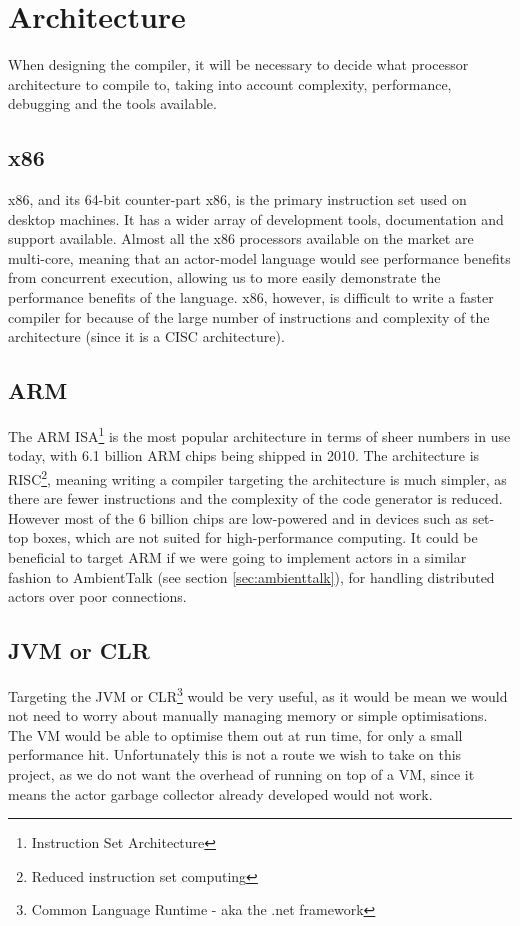 \documentclass[pdftex,11pt,a4paper]{report}
\begin{document}
\newpage
\section{Architecture}

When designing the compiler, it will be necessary to decide what processor architecture to compile to, taking into account complexity, performance, debugging and the tools available.

\subsection{x86}

x86, and its 64-bit counter-part x86, is the primary instruction set used on desktop machines. It has a wider array of development tools, documentation and support available.
Almost all the x86 processors available on the market are multi-core, meaning that an actor-model language would see performance benefits from concurrent execution, allowing us to more easily demonstrate the performance benefits of the language.
x86, however, is difficult to write a faster compiler for because of the large number of instructions and complexity of the architecture (since it is a CISC architecture).

\subsection{ARM}

The ARM ISA\footnote{Instruction Set Architecture} is the most popular architecture in terms of sheer numbers in use today, with 6.1 billion ARM chips being shipped in 2010\cite{theregister2011}.
The architecture is RISC\footnote{Reduced instruction set computing}, meaning writing a compiler targeting the architecture is much simpler, as there are fewer instructions and the complexity of the code generator is reduced.
However most of the 6 billion chips are low-powered and in devices such as set-top boxes, which are not suited for high-performance computing. It could be beneficial to target ARM if we were going to implement actors in a similar fashion to AmbientTalk (see section \ref{sec:ambienttalk}), for handling distributed actors over poor connections.

\subsection{JVM or CLR}

Targeting the JVM or CLR\footnote{Common Language Runtime - aka the .net framework} would be very useful, as it would be mean we would not need to worry about manually managing memory or simple optimisations. 
The VM would be able to optimise them out at run time, for only a small performance hit.
Unfortunately this is not a route we wish to take on this project, as we do not want the overhead of running on top of a VM, since it means the actor garbage collector already developed would not work.
\end{document}
